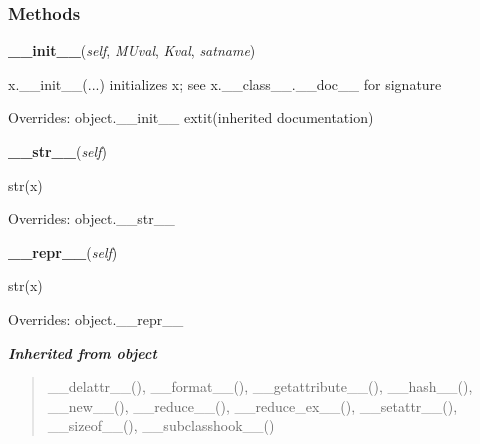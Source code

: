   \subsubsection{Methods}

    \vspace{0.5ex}

\hspace{.8\funcindent}\begin{boxedminipage}{\funcwidth}

    \raggedright \textbf{\_\_init\_\_}(\textit{self}, \textit{MUval}, \textit{Kval}, \textit{satname})

\setlength{\parskip}{2ex}
    x.\_\_init\_\_(...) initializes x; see x.\_\_class\_\_.\_\_doc\_\_ for 
    signature

\setlength{\parskip}{1ex}
      Overrides: object.\_\_init\_\_ 	extit{(inherited documentation)}

    \end{boxedminipage}

    \vspace{0.5ex}

\hspace{.8\funcindent}\begin{boxedminipage}{\funcwidth}

    \raggedright \textbf{\_\_str\_\_}(\textit{self})

\setlength{\parskip}{2ex}
    str(x)

\setlength{\parskip}{1ex}
      Overrides: object.\_\_str\_\_

    \end{boxedminipage}

    \vspace{0.5ex}

\hspace{.8\funcindent}\begin{boxedminipage}{\funcwidth}

    \raggedright \textbf{\_\_repr\_\_}(\textit{self})

\setlength{\parskip}{2ex}
    str(x)

\setlength{\parskip}{1ex}
      Overrides: object.\_\_repr\_\_

    \end{boxedminipage}


\large{\textbf{\textit{Inherited from object}}}

\begin{quote}
\_\_delattr\_\_(), \_\_format\_\_(), \_\_getattribute\_\_(), \_\_hash\_\_(), \_\_new\_\_(), \_\_reduce\_\_(), \_\_reduce\_ex\_\_(), \_\_setattr\_\_(), \_\_sizeof\_\_(), \_\_subclasshook\_\_()
\end{quote}

